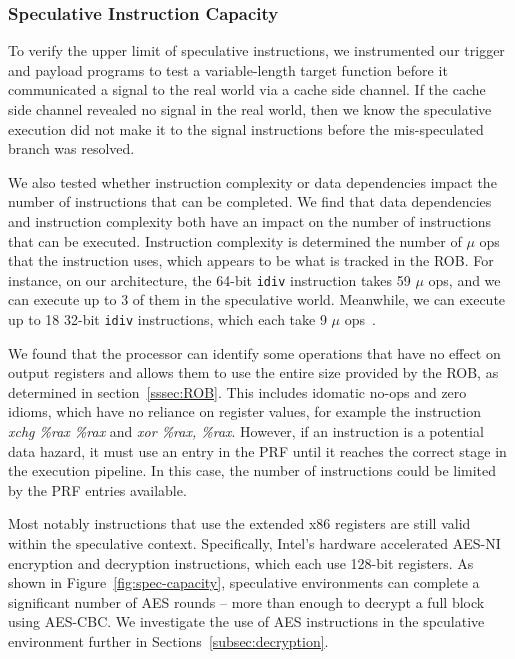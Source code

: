 
\subsubsection{Speculative Instruction Capacity}

To verify the upper limit of speculative instructions,
we instrumented our trigger and payload programs to test a variable-length target
function before it communicated a signal to the real world via a cache side
channel. If the cache side channel revealed no signal in the real world, then we know the
speculative execution did not make it to the signal instructions before the
mis-speculated branch was resolved.

We also tested whether instruction complexity or data dependencies impact
the number of instructions that can be completed. We find that data dependencies
and instruction complexity both have an impact on the number of instructions
that can be executed. Instruction complexity is determined the number of
$\mu$ ops that the instruction uses, which appears to be what is tracked in the ROB.
For instance, on our architecture, the 64-bit \texttt{idiv} instruction takes 59
$\mu$ ops, and we can execute up to 3 of them in the speculative world.
Meanwhile, we can execute up to 18 32-bit \texttt{idiv} instructions, which each
take 9 $\mu$ ops~\cite{intel-instruction-tables}.

We found that the processor can identify
some operations that have no effect on output registers and allows them to use the 
entire size provided by the ROB, as determined in section~\ref{sssec:ROB}. This includes 
idomatic no-ops and zero idioms, which have no reliance on register values, 
for example the instruction \textit{xchg \%rax \%rax} and \textit{xor \%rax, \%rax}. 
However, if an instruction is a potential data hazard, it must use an entry in the PRF
until it reaches the correct stage in the execution pipeline. In this case, the number 
of instructions could be limited by the PRF entries available.


Most notably instructions that use the extended x86 registers are still
valid within the speculative context. Specifically, Intel's hardware accelerated AES-NI
encryption and decryption instructions, which each use 128-bit registers.
As shown in Figure~\ref{fig:spec-capacity}, speculative environments can complete
a significant number of AES rounds -- more than enough to decrypt a full block 
using AES-CBC. We investigate the use of AES instructions in the spculative environment
further in Sections~\ref{subsec:decryption}.

